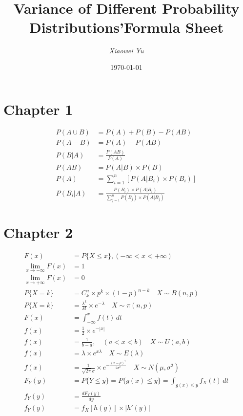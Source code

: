 \documentclass[12pt]{article}
\newcommand{\Comb}[2]{C^{#1}_{#2}}
\begin{document}
\title{\textbf{Variance of Different Probability Distributions'Formula Sheet}}
\author{\textit{Xiaowei Yu}}
\date{\today}
\maketitle

\newpage
\tableofcontents
\newpage

\section{Chapter 1}

\begin{align}
    P(A\cup B)&=P(A)+P(B)-P(AB)\\
    P(A-B)&=P(A)-P(AB)\\
    P(B|A)&=\frac{P(AB)}{P(A)}\\
    P(AB)&=P(A|B)\times P(B)\\
    P(A)&=\sum_{i = 1}^{n}  [P(A|B_i)\times P(B_i)]\\
    P(B_i|A)&=\frac{P(B_i)\times P(A|B_i)}{\sum_{j = 1}^{n} P(B_j)\times P(A|B_j)}
\end{align}

\section{Chapter 2}
\binom{}{} 
\begin{align}
    F(x)&=P\{X\leqslant x\}, (-\infty <x< +\infty)\\
    \lim_{x \to -\infty} F(x)&=1 \\
    \lim_{x \to +\infty} F(x)&=0 \\
    P\{X=k\}&=\Comb{n}{k} \times p^k \times (1-p)^{n-k} \quad X \sim B(n,p) \\
    P\{X=k\}&=\frac{\lambda^k}{k!} \times e^{-\lambda} \quad X\sim \pi(n,p)\\
    F(x)&=\int_{-\infty}^{x} f(t) \,dt \\
    f(x) &= \frac{1}{2} \times e^{-\left\lvert x \right\rvert }\\
    f(x) &= \frac{1}{b-a}, \quad (a<x<b) \quad X\sim U(a,b)\\
    f(x) &= \lambda \times e^{x\lambda} \quad X \sim E(\lambda)\\
    f(x) &= \frac{1}{\sqrt{2\pi}\sigma} \times e^{-\frac{(x-\mu)^2}{2\sigma^2}} \quad X\sim N(\mu,\sigma^2)\\
    F_Y(y) &= P\{Y\leqslant y\}= P\{g(x)\leqslant y\} = \int_{g(x)\leqslant y} f_X(t) \, dt\\
    f_Y(y) &= \frac{dF_Y(y)}{dy} \\
    f_Y(y) &= f_X[h(y)] \times \left\lvert h'(y) \right\rvert 
\end{align}
\end{document}
